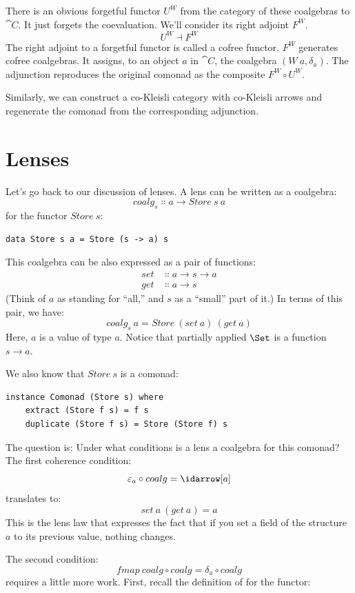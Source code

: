 There is an obvious forgetful functor $U^W$ from the category of
these coalgebras to $\cat{C}$. It just forgets the coevaluation. We'll
consider its right adjoint $F^W$.
\[U^W \dashv F^W\]
The right adjoint to a forgetful functor is called a cofree functor.
$F^W$ generates cofree coalgebras. It assigns, to an object
$a$ in $\cat{C}$, the coalgebra $(W\ a, \delta_a)$. The
adjunction reproduces the original comonad as the composite
$F^W \circ U^W$.

Similarly, we can construct a co-Kleisli category with co-Kleisli arrows
and regenerate the comonad from the corresponding adjunction.

\section{Lenses}

Let's go back to our discussion of lenses. A lens can be written as a
coalgebra:
\[coalg_s \Colon a \to Store\ s\ a\]
for the functor $Store\ s$:

\begin{Verbatim}
data Store s a = Store (s -> a) s
\end{Verbatim}
This coalgebra can be also expressed as a pair of functions:
\begin{align*}
set &\Colon a \to s \to a \\
get &\Colon a \to s
\end{align*}
(Think of $a$ as standing for ``all,'' and $s$ as a
``small'' part of it.) In terms of this pair, we have:
\[coalg_s\ a = Store\ (set\ a)\ (get\ a)\]
Here, $a$ is a value of type $a$. Notice that partially
applied $\Set$ is a function $s \to a$.

We also know that $Store\ s$ is a comonad:

\begin{Verbatim}
instance Comonad (Store s) where
    extract (Store f s) = f s
    duplicate (Store f s) = Store (Store f) s
\end{Verbatim}
The question is: Under what conditions is a lens a coalgebra for this
comonad? The first coherence condition:
\[\varepsilon_a \circ coalg = \idarrow[a]\]
translates to:
\[set\ a\ (get\ a) = a\]
This is the lens law that expresses the fact that if you set a field of
the structure $a$ to its previous value, nothing changes.

The second condition:
\[fmap\ coalg \circ coalg = \delta_a \circ coalg\]
requires a little more work. First, recall the definition of
 for the  functor:


